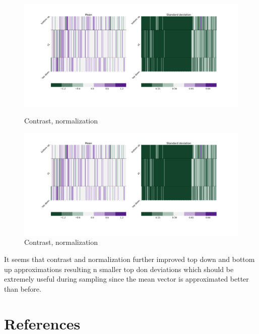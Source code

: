 \documentclass[12pt, english]{article}
\begin{document}
\begin{figure}[H]
  \begin{minipage}{0.5\linewidth}
    \centering
    \includegraphics[width=.75\linewidth]{z1_vis/z1_vis_norm_contrast/16_DenseLinLinLadderVAE_textures_contrastNorm_contrast-stats-1_vector_comparisons_1.png}
    \caption{Contrast, normalization}
    \label{fig:sample-norm-contrast-1}
  \end{minipage}
  \begin{minipage}{0.5\linewidth}
    \centering
    \includegraphics[width=.75\linewidth]{z1_vis/z1_vis_norm_contrast/16_DenseLinLinLadderVAE_textures_contrastNorm_contrast-stats-1_vector_comparisons_1.png}
    \caption{Contrast, normalization}
    \label{fig:sample-norm-contrast-2}
  \end{minipage}
\end{figure}

\vspace{4mm}

\par It seems that contrast and normalization further improved top down and bottom up approximations resulting n smaller top don deviations which should be extremely useful during sampling since the mean vector is approximated better than before.

\newpage

\section*{References}
\label{sec:references}
\printbibliography[heading=none]
\end{document}
